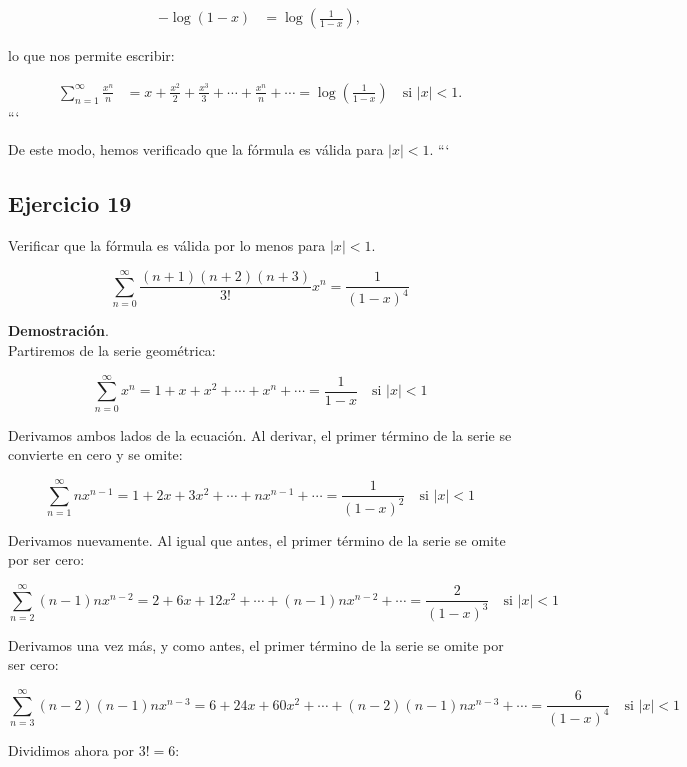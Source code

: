 \documentclass{article}
\begin{document}
    \begin{align*}
    -\log (1-x) &= \log \left(\frac{1}{1-x}\right),
    \end{align*}

    lo que nos permite escribir:

    \begin{align*}
    \sum_{n=1}^{\infty} \frac{x^{n}}{n} &= x + \frac{x^{2}}{2} + \frac{x^{3}}{3} + \cdots + \frac{x^{n}}{n} + \cdots = \log \left(\frac{1}{1-x}\right) \quad \text{si } |x| < 1.
    \end{align*}
    ```

    De este modo, hemos verificado que la fórmula es válida para $|x|<1$.
    ```

    \subsection*{Ejercicio 19}

    Verificar que la fórmula es válida por lo menos para $|x|<1$.

    $$
    \sum_{n=0}^{\infty} \frac{(n+1)(n+2)(n+3)}{3!} x^{n}=\frac{1}{(1-x)^{4}}
    $$

    \textbf{Demostración}.\\

    Partiremos de la serie geométrica:

    $$
    \sum_{n=0}^{\infty} x^{n}=1+x+x^{2}+\cdots+x^{n}+\cdots=\frac{1}{1-x} \quad \text {si } |x|<1
    $$

    Derivamos ambos lados de la ecuación. Al derivar, el primer término de la serie se convierte en cero y se omite:

    $$
    \sum_{n=1}^{\infty} n x^{n-1}=1+2 x+3 x^{2}+\cdots+n x^{n-1}+\cdots=\frac{1}{(1-x)^{2}} \quad \text {si } |x|<1
    $$

    Derivamos nuevamente. Al igual que antes, el primer término de la serie se omite por ser cero:

    $$
    \sum_{n=2}^{\infty} (n-1) n x^{n-2}=2+6 x+12 x^{2}+\cdots+(n-1) n x^{n-2}+\cdots=\frac{2}{(1-x)^{3}} \quad \text {si } |x|<1
    $$

    Derivamos una vez más, y como antes, el primer término de la serie se omite por ser cero:

    $$
    \sum_{n=3}^{\infty} (n-2)(n-1) n x^{n-3}=6+24 x+60 x^{2}+\cdots+(n-2)(n-1) n x^{n-3}+\cdots=\frac{6}{(1-x)^{4}} \quad \text {si } |x|<1
    $$

    Dividimos ahora por $3!=6$:
\end{document}
